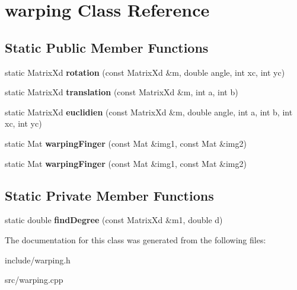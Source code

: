 \hypertarget{classwarping}{}\section{warping Class Reference}
\label{classwarping}
\subsection*{Static Public Member Functions}
\begin{DoxyCompactItemize}
\item 
static Matrix\+Xd {\bfseries rotation} (const Matrix\+Xd \&m, double angle, int xc, int yc)\hypertarget{classwarping_a478d01f5448e5264668ea80b1a7eaf12}{}\label{classwarping_a478d01f5448e5264668ea80b1a7eaf12}

\item 
static Matrix\+Xd {\bfseries translation} (const Matrix\+Xd \&m, int a, int b)\hypertarget{classwarping_a80292615cbce58308f9e9f905518785f}{}\label{classwarping_a80292615cbce58308f9e9f905518785f}

\item 
static Matrix\+Xd {\bfseries euclidien} (const Matrix\+Xd \&m, double angle, int a, int b, int xc, int yc)\hypertarget{classwarping_a6cb783f67401cf614813d95f8e4120c8}{}\label{classwarping_a6cb783f67401cf614813d95f8e4120c8}

\item 
static Mat {\bfseries warping\+Finger} (const Mat \&img1, const Mat \&img2)\hypertarget{classwarping_ac0e7bfe96c5f849784d8c9d2fa8e7ab8}{}\label{classwarping_ac0e7bfe96c5f849784d8c9d2fa8e7ab8}

\item 
static Mat {\bfseries warping\+Finger} (const Mat \&img1, const Mat \&img2)\hypertarget{classwarping_aeaffbb6334e05ab32a443bceeaf039c3}{}\label{classwarping_aeaffbb6334e05ab32a443bceeaf039c3}

\end{DoxyCompactItemize}
\subsection*{Static Private Member Functions}
\begin{DoxyCompactItemize}
\item 
static double {\bfseries find\+Degree} (const Matrix\+Xd \&m1, double d)\hypertarget{classwarping_a726105ca6923d8e31db11b8296edcc24}{}\label{classwarping_a726105ca6923d8e31db11b8296edcc24}

\end{DoxyCompactItemize}


The documentation for this class was generated from the following files\+:\begin{DoxyCompactItemize}
\item 
include/warping.\+h\item 
src/warping.\+cpp\end{DoxyCompactItemize}
